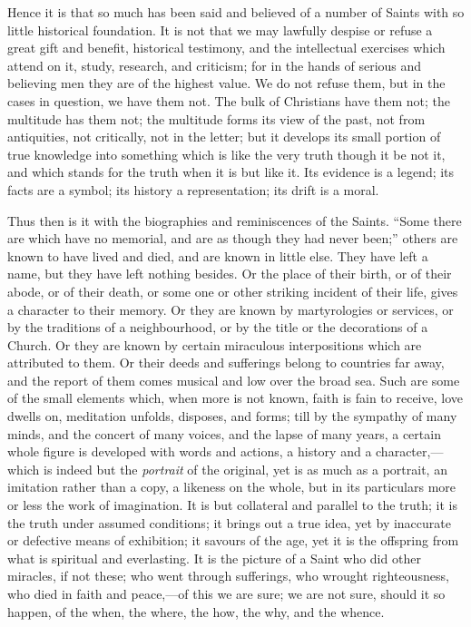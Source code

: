 Hence it is that so much has been said and
believed of a number of Saints with so little historical foundation.
It is not that we may lawfully despise or refuse a great gift and
benefit, historical testimony, and the intellectual exercises which
attend on it, study, research, and criticism; for in the hands of
serious and believing men they are of the highest value. We do not
refuse them, but in the cases in question, we have them not. The bulk
of Christians have them not; the multitude has them not; the multitude
forms its view of the past, not from antiquities, not critically, not
in the letter; but it develops its small portion of true knowledge
into something which is like the very truth though it be not it, and
which stands for the truth when it is but like it. Its evidence is a
legend; its facts are a symbol; its history a representation; its
drift is a moral.

Thus then is it with the biographies and
reminiscences of the Saints. ``Some there are which have no memorial,
and are as though they had never been;'' others are known to have lived
and died, and are known in little else. They have left a name, but
they have left nothing besides. Or the place of their birth, or of
their abode, or of their death, or some one or other striking incident
of their life, gives a character to their memory. Or they are known by
martyrologies or services, or by the traditions of a neighbourhood, or
by the title or the decorations of a Church. Or they are known by
certain miraculous interpositions which are attributed to them. Or
their deeds and sufferings belong to countries far away, and the
report of them comes musical and low over the broad sea. Such are some
of the small elements which, when more is not known, faith is fain to
receive, love dwells on, meditation unfolds, disposes, and forms; till
by the sympathy of many minds, and the concert of many voices, and
the lapse of many years, a certain whole figure is developed with
words and actions, a history and a character,—which is indeed but
the \emph{portrait} of the original, yet is as much as a portrait, an
imitation rather than a copy, a likeness on the whole, but in its
particulars more or less the work of imagination. It is but collateral
and parallel to the truth; it is the truth under assumed conditions;
it brings out a true idea, yet by inaccurate or defective means of
exhibition; it savours of the age, yet it is the offspring from what
is spiritual and everlasting. It is the picture of a Saint who did
other miracles, if not these; who went through sufferings, who wrought
righteousness, who died in faith and peace,—of this we are sure; we
are not sure, should it so happen, of the when, the where, the how,
the why, and the whence.

